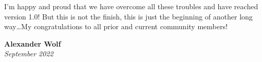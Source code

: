 I'm happy and proud that we have overcome all these troubles and have
reached version 1.0! But this is not the finish, this is just the
beginning of another long way\ldots My congratulations to all prior
and current community members!

\begin{flushright}
\textbf{Alexander Wolf} \\ \emph{September 2022}
\end{flushright}


